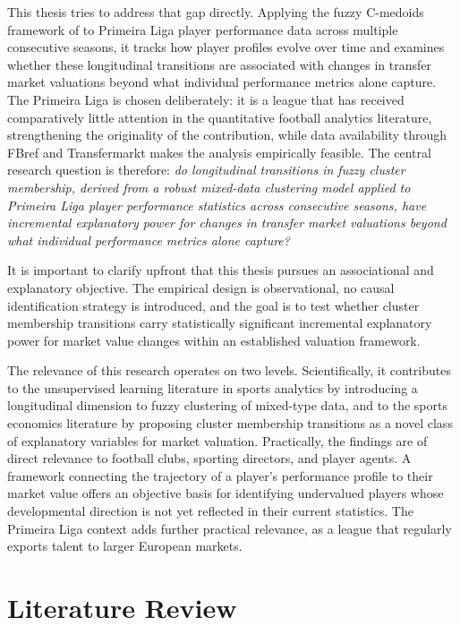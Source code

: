 \documentclass[a4paper,11pt]{report}
\begin{document}
This thesis tries to address that gap directly. Applying the fuzzy C-medoids framework of \cite{durso2022robust} to Primeira Liga player performance data across multiple consecutive seasons, it tracks how player profiles evolve over time and examines whether these longitudinal transitions are associated with changes in transfer market valuations beyond what individual performance metrics alone capture. The Primeira Liga is chosen deliberately: it is a league that has received comparatively little attention in the quantitative football analytics literature, strengthening the originality of the contribution, while data availability through FBref and Transfermarkt makes the analysis empirically feasible. The central research question is therefore: \textit{do longitudinal transitions in fuzzy cluster membership, derived from a robust mixed-data clustering model applied to Primeira Liga player performance statistics across consecutive seasons, have incremental explanatory power for changes in transfer market valuations beyond what individual performance metrics alone capture?}

It is important to clarify upfront that this thesis pursues an associational and explanatory objective. The empirical design is observational, no causal identification strategy is introduced, and the goal is to test whether cluster membership transitions carry statistically significant incremental explanatory power for market value changes within an established valuation framework.

The relevance of this research operates on two levels. Scientifically, it contributes to the unsupervised learning literature in sports analytics by introducing a longitudinal dimension to fuzzy clustering of mixed-type data, and to the sports economics literature by proposing cluster membership transitions as a novel class of explanatory variables for market valuation. Practically, the findings are of direct relevance to football clubs, sporting directors, and player agents. A framework connecting the trajectory of a player's performance profile to their market value offers an objective basis for identifying undervalued players whose developmental direction is not yet reflected in their current statistics. The Primeira Liga context adds further practical relevance, as a league that regularly exports talent to larger European markets.


\chapter{Literature Review}
\end{document}
